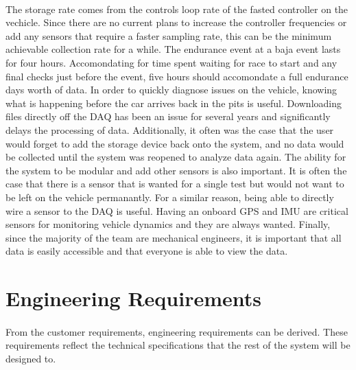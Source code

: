 \paragraph{}
The storage rate comes from the controls loop rate of the fasted controller on the vechicle.
Since there are no current plans to increase the controller frequencies or add any sensors that require a faster sampling rate, this can be the minimum achievable collection rate for a while.
The endurance event at a baja event lasts for four hours.
Accomondating for time spent waiting for race to start and any final checks just before the event, five hours should accomondate a full endurance days worth of data.
In order to quickly diagnose issues on the vehicle, knowing what is happening before the car arrives back in the pits is useful.
Downloading files directly off the DAQ has been an issue for several years and significantly delays the processing of data.
Additionally, it often was the case that the user would forget to add the storage device back onto the system, and no data would be collected until the system was reopened to analyze data again.
The ability for the system to be modular and add other sensors is also important.
It is often the case that there is a sensor that is wanted for a single test but would not want to be left on the vehicle permanantly.
For a similar reason, being able to directly wire a sensor to the DAQ is useful.
Having an onboard GPS and IMU are critical sensors for monitoring vehicle dynamics and they are always wanted.
Finally, since the majority of the team are mechanical engineers, it is important that all data is easily accessible and that everyone is able to view the data.

\section{Engineering Requirements}

\paragraph{}
From the customer requirements, engineering requirements can be derived.
These requirements reflect the technical specifications that the rest of the system will be designed to.

